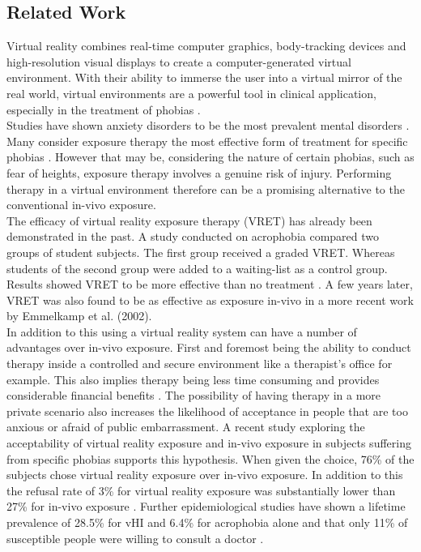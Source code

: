 \subsection{Related Work}
Virtual reality combines real-time computer graphics, body-tracking devices and high-resolution visual displays to create a computer-generated virtual environment. With their ability to immerse the user into a virtual mirror of the real world, virtual environments are a powerful tool in clinical application, especially in the treatment of phobias \cite{RIVA2003}. \\
Studies have shown anxiety disorders to be the most prevalent mental disorders \cite{KESSLER2005}. Many consider exposure therapy the most effective form of treatment for specific phobias \cite{DERUBEIS1998}. However that may be, considering the nature of certain phobias, such as fear of heights, exposure therapy involves a genuine risk of injury. Performing therapy in a virtual environment therefore can be a promising alternative to the conventional in-vivo exposure.\\ 
The efficacy of virtual reality exposure therapy (VRET) has already been demonstrated in the past. A study conducted on acrophobia compared two groups of student subjects. The first group received a graded VRET. Whereas students of the second group were added to a waiting-list as a control group. Results showed VRET to be more effective than no treatment \cite{ROTHBAUM1995}. A few years later, VRET was also found to be as effective as exposure in-vivo in a more recent work by Emmelkamp et al. (2002).\\
In addition to this using a virtual reality system can have a number of advantages over in-vivo exposure. First and foremost being the ability to conduct therapy inside a controlled and secure environment like a therapist's office for example. This also implies therapy being less time consuming and provides considerable financial benefits \cite{CAVANAGH2004}. The possibility of having therapy in a more private scenario also increases the likelihood of acceptance in people that are too anxious or afraid of public embarrassment. 
A recent study exploring the acceptability of virtual reality exposure and in-vivo exposure in subjects suffering from specific phobias supports this hypothesis. When given the choice, 76\% of the subjects chose virtual reality exposure over in-vivo exposure. In addition to this the refusal rate of 3\% for virtual reality exposure was substantially lower than 27\% for in-vivo exposure \cite{GARCIA2007}. Further epidemiological studies have shown a lifetime prevalence of 28.5\% for vHI and 6.4\% for acrophobia alone and that only 11\% of susceptible people were willing to consult a doctor \cite{HUPPERT2013} \cite{KAPFHAMMER2015}.\\
